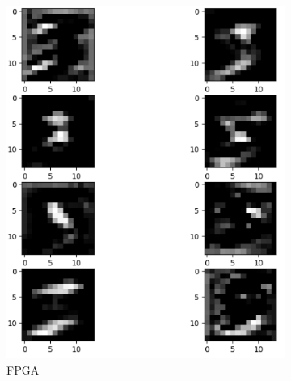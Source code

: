 \begin{figure}[H]
\centering
    \begin{subfigure}[b]{0.45\linewidth}
        \includegraphics[width=1\linewidth]{Images/fpgac4.png}
        \caption{FPGA}
        \label{fig:enter-label}
    \end{subfigure}
    \begin{subfigure}[b]{0.45\linewidth}

\end{subfigure}
\end{figure}
